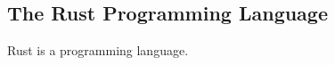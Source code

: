 
\subsection{The Rust Programming Language}
\label{chap:background_rust}

Rust \cite{web:rust_lang} is a programming language.
